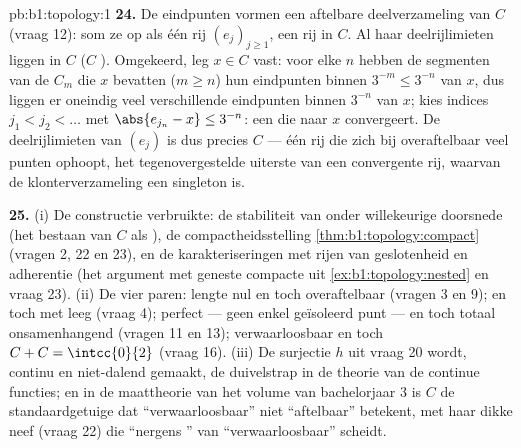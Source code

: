 \begin{solution}{pb:b1:topology:1}
\textbf{24.} De eindpunten vormen een aftelbare  deelverzameling
van $C$ (vraag 12): som ze op als één rij $(e_j)_{j\geq1}$, een rij in
$C$. Al haar deelrijlimieten liggen in $C$ ($C$ ). Omgekeerd, leg
$x \in C$ vast: voor elke $n$ hebben de segmenten van de $C_m$ die $x$
bevatten ($m \geq n$) hun eindpunten binnen $3^{-m} \leq 3^{-n}$ van $x$,
dus liggen er oneindig veel verschillende eindpunten binnen $3^{-n}$ van
$x$; kies indices $j_1 < j_2 < \dots$ met $\abs{e_{j_n} - x} \leq
3^{-n}$: een  die naar $x$ convergeert. De 
deelrijlimieten van $(e_j)$ is dus precies $C$ --- één rij die zich bij
overaftelbaar veel punten ophoopt, het tegenovergestelde uiterste van een
convergente rij, waarvan de klonterverzameling een singleton is.

\textbf{25.} (i) De constructie verbruikte: de stabiliteit van  onder willekeurige doorsnede (het bestaan van $C$ als
), de compactheidsstelling
\cref{thm:b1:topology:compact} (vragen 2, 22 en 23), en de
karakteriseringen met rijen van geslotenheid en adherentie (het argument
met geneste compacte  uit \cref{ex:b1:topology:nested} en
vraag 23). (ii) De vier paren: lengte nul en toch overaftelbaar (vragen 3
en 9);  en toch met leeg  (vraag 4); perfect --- geen
enkel geïsoleerd punt --- en toch totaal onsamenhangend (vragen 11 en
13); verwaarloosbaar en toch $C + C = \intcc{0}{2}$ (vraag 16). (iii) De
surjectie $h$ uit vraag 20 wordt, continu en niet-dalend gemaakt, de
duivelstrap in de theorie van de continue functies; en in de maattheorie
van het volume van bachelorjaar 3 is $C$ de standaardgetuige dat
``verwaarloosbaar'' niet ``aftelbaar'' betekent, met haar dikke neef
(vraag 22) die ``nergens '' van ``verwaarloosbaar'' scheidt.
\end{solution}
